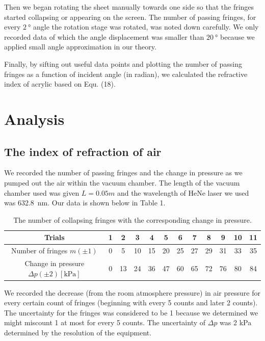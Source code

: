 \documentclass[12pt]{article}
\begin{document}
Then we began rotating the sheet manually towards one side so that the fringes started collapsing or appearing on the screen. The number of passing fringes, for every $\SI{2}{\degree}$ angle the rotation stage was rotated, was noted down carefully. We only recorded data of which the angle displacement was smaller than $\SI{20}{\degree}$ because we applied small angle approximation in our theory.

Finally, by sifting out useful data points and plotting the number of passing fringes as a function of incident angle (in radian), we calculated the refractive index of acrylic based on Equ. (18).



\section{Analysis}

\subsection{The index of refraction of air}

We recorded the number of passing fringes and the change in pressure as we pumped out the air within the vacuum chamber. The length of the vacuum chamber used was given $L=0.05\si{m}$ and the wavelength of HeNe laser we used was \SI{632.8}{\nano\meter}. Our data is shown below in Table 1.
\begin{table}[!hb]
		
	\begin{center}
		 \caption{The number of collapsing fringes with the corresponding change in pressure. }
			\begin{tabular}{|c|c|c|c|c|c|c|c|c|c|c|c|}
				\hline\hline
			Trials	& 1 & 2 & 3 & 4&5&6&7&8&9&10&11\\ \hline
				Number of fringes  $m (\pm{1})$&0&5&10&15&20&25&27&29&31&33&35\\ \hline
				Change in pressure $\Delta{p}(\pm{2}) [\si{\kilo\pascal}]$ &0&13&24&36&47&60&65&72&76&80&84\\
				\hline
			\end{tabular}
	\end{center}
\end{table}

We recorded the decrease (from the room atmosphere pressure) in air pressure for every certain count of fringes (beginning with every 5 counts and later 2 counts). The uncertainty for the fringes was considered to be 1 because we determined we might miscount 1 at most for every 5 counts. The uncertainty of $\Delta{p}$ was 2 \si{kPa} determined by the resolution of the equipment. 
\end{document}

